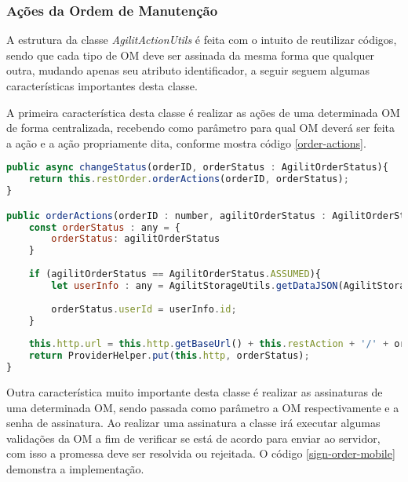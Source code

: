 \subsubsection{Ações da Ordem de Manutenção}
A estrutura da classe \textit{AgilitActionUtils} é feita com o intuito de reutilizar códigos, sendo que cada tipo de OM deve ser assinada da mesma forma que qualquer outra, mudando apenas seu atributo identificador, a seguir seguem algumas características importantes desta classe.

A primeira característica desta classe é realizar as ações de uma determinada OM de forma centralizada, recebendo como parâmetro para qual OM deverá ser feita a ação e a ação propriamente dita, conforme mostra código \ref{order-actions}.

\begin{lstlisting}[language=JavaScript, caption={Alterar situação da ordem de manutenção}, label={order-actions}]
public async changeStatus(orderID, orderStatus : AgilitOrderStatus){    
	return this.restOrder.orderActions(orderID, orderStatus);
}

public orderActions(orderID : number, agilitOrderStatus : AgilitOrderStatus){
	const orderStatus : any = {
		orderStatus: agilitOrderStatus        
	}
	
	if (agilitOrderStatus == AgilitOrderStatus.ASSUMED){
		let userInfo : any = AgilitStorageUtils.getDataJSON(AgilitStorageTypes.USERDATA);
		
		orderStatus.userId = userInfo.id;
	}    
	
	this.http.url = this.http.getBaseUrl() + this.restAction + '/' + orderID + '/status';
	return ProviderHelper.put(this.http, orderStatus);
}

\end{lstlisting}

Outra característica muito importante desta classe é realizar as assinaturas de uma determinada OM, sendo passada como parâmetro a OM respectivamente e a senha de assinatura. Ao realizar uma assinatura a classe irá executar algumas validações da OM a fim de verificar se está de acordo para enviar ao servidor, com isso a promessa deve ser resolvida ou rejeitada.
O código \ref{sign-order-mobile} demonstra a implementação.

